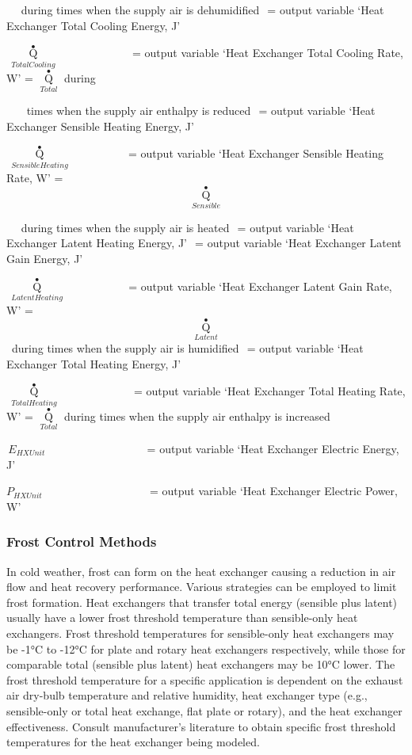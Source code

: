 ~~ during times when the supply air is dehumidified \(_{ }\) = output variable `Heat Exchanger Total Cooling Energy, J'

\(\,{\mathop Q\limits^ \bullet_{TotalCooling}}\) ~~~~~~~~~~~~ = output variable `Heat Exchanger Total Cooling Rate, W' = \({\mathop Q\limits^ \bullet_{Total}}\) during

~~~ times when the supply air enthalpy is reduced \(_{ }\) = output variable `Heat Exchanger Sensible Heating Energy, J'

\(\,{\mathop Q\limits^ \bullet_{SensibleHeating}}\) ~~~~~~~~~ = output variable `Heat Exchanger Sensible Heating Rate, W' = \[{\mathop Q\limits^ \bullet_{Sensible}}\]

~~ during times when the supply air is heated \(_{ }\) = output variable `Heat Exchanger Latent Heating Energy, J' \(_{ }\) = output variable `Heat Exchanger Latent Gain Energy, J'

\(\,{\mathop Q\limits^ \bullet_{LatentHeating}}\) ~~~~~~~~~~ = output variable `Heat Exchanger Latent Gain Rate, W' = \[{\mathop Q\limits^ \bullet_{Latent}}\] ~during times when the supply air is humidified \(_{ }\) = output variable `Heat Exchanger Total Heating Energy, J'

\(\,{\mathop Q\limits^ \bullet_{TotalHeating}}\) ~~~~~~~~~~~~ = output variable `Heat Exchanger Total Heating Rate, W' = \({\mathop Q\limits^ \bullet_{Total}}\) during times when the supply air enthalpy is increased

\(\,{E_{HXUnit}}\) ~~~~~~~~~~~~~~~~~ = output variable `Heat Exchanger Electric Energy, J'

\({P_{HXUnit}}\) ~~~~~~~~~~~~~~~~~~ = output variable `Heat Exchanger Electric Power, W'

\subsubsection{Frost Control Methods}\label{frost-control-methods}

In cold weather, frost can form on the heat exchanger causing a reduction in air flow and heat recovery performance. Various strategies can be employed to limit frost formation. Heat exchangers that transfer total energy (sensible plus latent) usually have a lower frost threshold temperature than sensible-only heat exchangers. Frost threshold temperatures for sensible-only heat exchangers may be -1°C to -12°C for plate and rotary heat exchangers respectively, while those for comparable total (sensible plus latent) heat exchangers may be 10°C lower. The frost threshold temperature for a specific application is dependent on the exhaust air dry-bulb temperature and relative humidity, heat exchanger type (e.g., sensible-only or total heat exchange, flat plate or rotary), and the heat exchanger effectiveness. Consult manufacturer's literature to obtain specific frost threshold temperatures for the heat exchanger being modeled.

